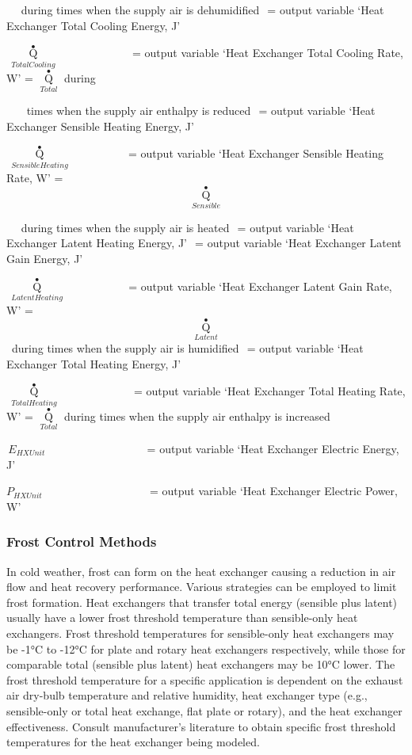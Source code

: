 ~~ during times when the supply air is dehumidified \(_{ }\) = output variable `Heat Exchanger Total Cooling Energy, J'

\(\,{\mathop Q\limits^ \bullet_{TotalCooling}}\) ~~~~~~~~~~~~ = output variable `Heat Exchanger Total Cooling Rate, W' = \({\mathop Q\limits^ \bullet_{Total}}\) during

~~~ times when the supply air enthalpy is reduced \(_{ }\) = output variable `Heat Exchanger Sensible Heating Energy, J'

\(\,{\mathop Q\limits^ \bullet_{SensibleHeating}}\) ~~~~~~~~~ = output variable `Heat Exchanger Sensible Heating Rate, W' = \[{\mathop Q\limits^ \bullet_{Sensible}}\]

~~ during times when the supply air is heated \(_{ }\) = output variable `Heat Exchanger Latent Heating Energy, J' \(_{ }\) = output variable `Heat Exchanger Latent Gain Energy, J'

\(\,{\mathop Q\limits^ \bullet_{LatentHeating}}\) ~~~~~~~~~~ = output variable `Heat Exchanger Latent Gain Rate, W' = \[{\mathop Q\limits^ \bullet_{Latent}}\] ~during times when the supply air is humidified \(_{ }\) = output variable `Heat Exchanger Total Heating Energy, J'

\(\,{\mathop Q\limits^ \bullet_{TotalHeating}}\) ~~~~~~~~~~~~ = output variable `Heat Exchanger Total Heating Rate, W' = \({\mathop Q\limits^ \bullet_{Total}}\) during times when the supply air enthalpy is increased

\(\,{E_{HXUnit}}\) ~~~~~~~~~~~~~~~~~ = output variable `Heat Exchanger Electric Energy, J'

\({P_{HXUnit}}\) ~~~~~~~~~~~~~~~~~~ = output variable `Heat Exchanger Electric Power, W'

\subsubsection{Frost Control Methods}\label{frost-control-methods}

In cold weather, frost can form on the heat exchanger causing a reduction in air flow and heat recovery performance. Various strategies can be employed to limit frost formation. Heat exchangers that transfer total energy (sensible plus latent) usually have a lower frost threshold temperature than sensible-only heat exchangers. Frost threshold temperatures for sensible-only heat exchangers may be -1°C to -12°C for plate and rotary heat exchangers respectively, while those for comparable total (sensible plus latent) heat exchangers may be 10°C lower. The frost threshold temperature for a specific application is dependent on the exhaust air dry-bulb temperature and relative humidity, heat exchanger type (e.g., sensible-only or total heat exchange, flat plate or rotary), and the heat exchanger effectiveness. Consult manufacturer's literature to obtain specific frost threshold temperatures for the heat exchanger being modeled.

